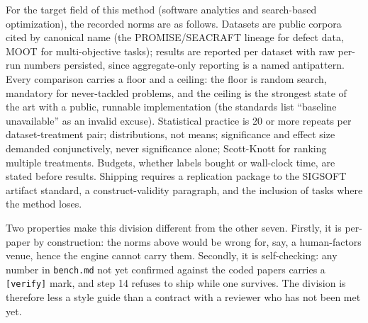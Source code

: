For the target field of this method (software analytics and
search-based optimization), the recorded norms are as follows.
Datasets are public corpora cited by canonical name (the
PROMISE/SEACRAFT lineage for defect data, MOOT for multi-objective
tasks); results are reported per dataset with raw per-run numbers
persisted, since aggregate-only reporting is a named antipattern.
Every comparison carries a floor and a ceiling: the floor is random
search, mandatory for never-tackled problems, and the ceiling is the
strongest state of the art with a public, runnable implementation (the
standards list ``baseline unavailable'' as an invalid excuse).
Statistical practice is 20 or more repeats per dataset-treatment pair;
distributions, not means; significance and effect size demanded
conjunctively, never significance alone; Scott-Knott for ranking
multiple treatments.
Budgets, whether labels bought or wall-clock time, are stated before
results.
Shipping requires a replication package to the SIGSOFT artifact
standard, a construct-validity paragraph, and the inclusion of tasks
where the method loses.

Two properties make this division different from the other seven.
Firstly, it is per-paper by construction: the norms above would be
wrong for, say, a human-factors venue, hence the engine cannot carry
them.
Secondly, it is self-checking: any number in \texttt{bench.md} not yet
confirmed against the coded papers carries a \texttt{[verify]} mark,
and step 14 refuses to ship while one survives.
The division is therefore less a style guide than a contract with a
reviewer who has not been met yet.
